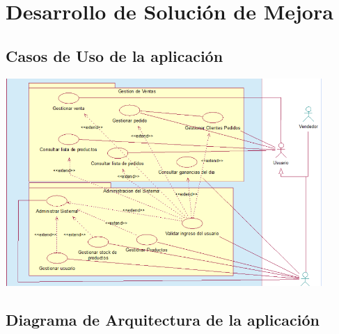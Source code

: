 \documentclass[preprint,12pt]{elsarticle}
\begin{document}
\section{Desarrollo de Solución de Mejora}
\subsection{\textbf{ Casos de Uso de la aplicación}}
\begin{center}
	\includegraphics[width=12cm]{./imagen/casouso} 
	\end{center}
\subsection{\textbf{ Diagrama de Arquitectura de la aplicación }}
\end{document}

